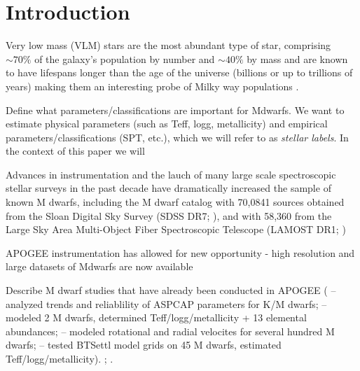 \documentclass[modern]{aastex62}
\begin{document}
 
\section{Introduction} \label{sec:intro}

Very low mass (VLM) stars are the most abundant type of star, comprising $\sim 70 \%$ of the galaxy's population by number \citep{Bochanski:2010} and $\sim 40 \%$ by mass and are known to have lifespans longer than the age of the universe (billions or up to trillions of years) \citep{Laughlin:1997} making them an interesting probe of Milky way populations \citep{Bochanski:2007}.


Define what parameters/classifications are important for Mdwarfs. We want to estimate physical parameters (such as Teff, logg, metallicity) and empirical parameters/classifications (SPT, etc.), which we will refer to as \emph{stellar labels}. In the context of this paper we will 


Advances in instrumentation and the lauch of many large scale spectroscopic stellar surveys in the past decade have dramatically increased the sample of known M dwarfs, including the \citealt{West:2011} M dwarf catalog with 70,0841 sources obtained from the Sloan Digital Sky Survey (SDSS DR7; \citealt{Abazajian:2009}), and \citealt{Yi:2014} with  58,360 from the Large Sky Area Multi-Object Fiber Spectroscopic Telescope (LAMOST DR1; \citealt{Zhao:2012})

APOGEE instrumentation has allowed for new opportunity - high resolution and large datasets of Mdwarfs are now available

Describe M dwarf studies that have already been conducted in APOGEE (\citealt{Schmidt:2016} -- analyzed trends and reliablility of ASPCAP parameters for K/M dwarfs; \citealt{Souto:2017} -- modeled 2 M dwarfs, determined Teff/logg/metallicity + 13 elemental abundances; \citealt{Desphande:2013} -- modeled rotational and radial velocites for several hundred M dwarfs; \citealt{Rajpurohit:2018} -- tested BTSettl model grids on 45 M dwarfs, estimated Teff/logg/metallicity). \citealt{Gilhool:2018}; \citealt{Skinner:2018}.
\end{document}
